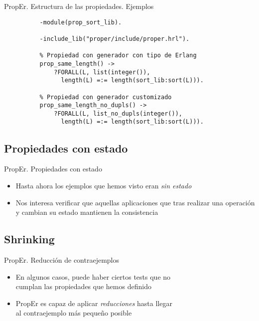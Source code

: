 \documentclass{beamer}
\begin{document}
      \begin{frame}[fragile]{PropEr. Estructura de las propiedades. Ejemplos}
        \begin{verbatim}
          -module(prop_sort_lib).

          -include_lib("proper/include/proper.hrl").

          % Propiedad con generador con tipo de Erlang
          prop_same_length() ->
              ?FORALL(L, list(integer()),
                length(L) =:= length(sort_lib:sort(L))).

          % Propiedad con generador customizado
          prop_same_length_no_dupls() ->
              ?FORALL(L, list_no_dupls(integer()),
                length(L) =:= length(sort_lib:sort(L))).
        \end{verbatim}
      \end{frame}

    \subsection{Propiedades con estado}
      \begin{frame}{PropEr. Propiedades con estado}
        \begin{itemize}
          \item Hasta ahora los ejemplos que hemos visto eran \textit{sin estado}
          \item Nos interesa verificar que aquellas aplicaciones que tras realizar
          una operación y cambian su estado mantienen la consistencia
        \end{itemize}

      \end{frame}
    \subsection{Shrinking}
      \begin{frame}{PropEr. Reducción de contraejemplos}
        \begin{itemize}
          \item En algunos casos, puede haber ciertos tests que no\\
          cumplan las propiedades que hemos definido
          \item PropEr es capaz de aplicar \textit{reducciones} hasta llegar\\
          al contraejemplo más pequeño posible
        \end{itemize}
      \end{frame}
\end{document}
